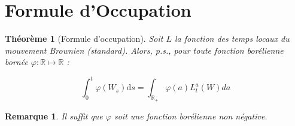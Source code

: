 \documentclass[openany]{book}
\newcommand{\R}{\mathbb{R}}
\newcommand{\1}{\mathbbm{1}}
\renewcommand{\d}{\mathrm{d}}
\theoremstyle{thmfont}
\newtheorem{theorem}{Théorème}[chapter]
\theoremstyle{deffont}
\theoremstyle{thmfont}
\theoremstyle{deffont}
\newtheorem{remark}[remark]{Remarque}
\begin{document}

\section{Formule d'Occupation}

\begin{theorem}[Formule d'occupation]
\label{thm:occupation} Soit $L$ la fonction des temps locaux du mouvement Brownien (standard). Alors, p.s., pour toute fonction borélienne bornée $\varphi : \R \mapsto \R$ :

\begin{equation}
  \int_0^t \varphi(W_s) \d s = \int_{\R_+}\varphi(a)L_t^a(W)da
  \label{eq:occupation}
\end{equation}

\end{theorem}

\begin{remark}
  Il suffit que $\varphi$ soit une fonction borélienne non négative.
  \end{remark}
\end{document}
